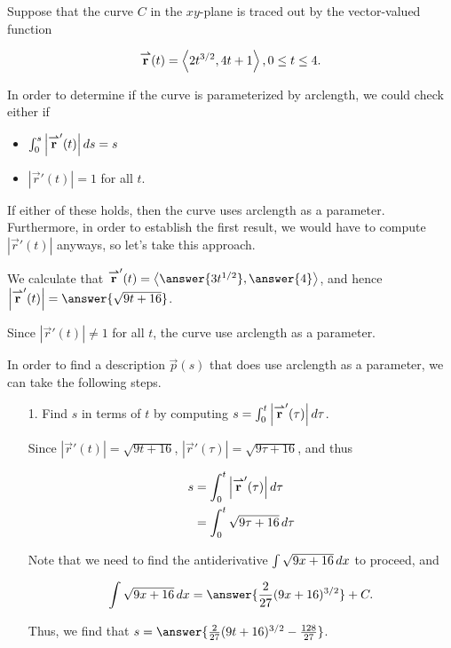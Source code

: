 \documentclass{ximera}
\author{Jim Talamo}
\begin{document}
\begin{exercise}
 
Suppose that the curve $C$ in the $xy$-plane is traced out by the vector-valued function 

\[
{\overset{\boldsymbol{\rightharpoonup}}{\mathbf{r}}}(t) = \left\langle 2t^{3/2},4t+1\right\rangle, 0 \leq t \leq 4.
\] 

In order to determine if the curve is parameterized by arclength, we could check either if

\begin{itemize}
\item $\int_0^s \left|{\overset{\boldsymbol{\rightharpoonup}}{\mathbf{r}}}'(t)\right| \mathop{}\!d s = s$
\item $\left|\vec{r}'(t)\right|=1$ for all $t$.
\end{itemize}

If either of these holds, then the curve uses arclength as a parameter.  Furthermore, in order to establish the first result, we would have to compute $\left|\vec{r}'(t)\right|$ anyways, so let's take this approach.

We calculate that $\vec{r}'(t) = \vector{\answer{3t^{1/2}},\answer{4}}$, and hence $\left|\vec{r}'(t)\right| = \answer{\sqrt{9t+16}}$.

Since $\left|\vec{r}'(t)\right| \neq 1$ for all $t$, the curve  use arclength as a parameter.

\begin{exercise}
In order to find a description $\vec{p}(s)$ that does use arclength as a parameter, we can take the following steps.

\begin{itemize}
\item[1.] Find $s$ in terms of $t$ by computing $s = \int_0^t \left|{\overset{\boldsymbol{\rightharpoonup}}{\mathbf{r}}}'(\tau)\right| \mathop{}\!d \tau$.

Since $\left|\vec{r}'(t)\right| = \sqrt{9t+16}$, $\left|\vec{r}'(\tau)\right| = \sqrt{9\tau+16}$, and thus

\begin{align*}
s &= \int_0^t \left|{\overset{\boldsymbol{\rightharpoonup}}{\mathbf{r}}}'(\tau)\right| \mathop{}\!d \tau \\
&= \int_0^t \sqrt{9\tau+16} \mathop{}\!d \tau
\end{align*}

Note that we need to find the antiderivative $\int \sqrt{9x+16} \mathop{}\!d x$ to proceed, and 

\[
\int \sqrt{9x+16} \d x = \answer{\frac{2}{27} (9x+16)^{3/2}} +C.
\] 

Thus, we find that $s = \answer{\frac{2}{27} (9t+16)^{3/2} - \frac{128}{27}}$.


\end{itemize}
\end{exercise}
\end{exercise}
\end{document}
